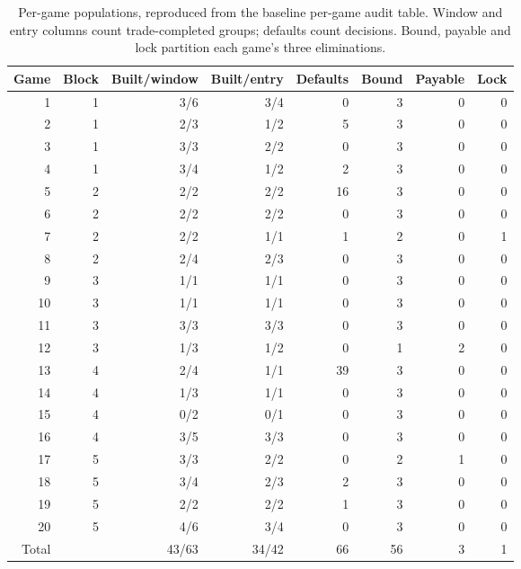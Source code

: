 \begin{table}[htbp]
\centering\small
\begin{tabular}{rrrrrrrr}\toprule
Game & Block & Built/window & Built/entry & Defaults & Bound & Payable & Lock\\\midrule
1 & 1 & 3/6 & 3/4 & 0 & 3 & 0 & 0 \\
2 & 1 & 2/3 & 1/2 & 5 & 3 & 0 & 0 \\
3 & 1 & 3/3 & 2/2 & 0 & 3 & 0 & 0 \\
4 & 1 & 3/4 & 1/2 & 2 & 3 & 0 & 0 \\
5 & 2 & 2/2 & 2/2 & 16 & 3 & 0 & 0 \\
6 & 2 & 2/2 & 2/2 & 0 & 3 & 0 & 0 \\
7 & 2 & 2/2 & 1/1 & 1 & 2 & 0 & 1 \\
8 & 2 & 2/4 & 2/3 & 0 & 3 & 0 & 0 \\
9 & 3 & 1/1 & 1/1 & 0 & 3 & 0 & 0 \\
10 & 3 & 1/1 & 1/1 & 0 & 3 & 0 & 0 \\
11 & 3 & 3/3 & 3/3 & 0 & 3 & 0 & 0 \\
12 & 3 & 1/3 & 1/2 & 0 & 1 & 2 & 0 \\
13 & 4 & 2/4 & 1/1 & 39 & 3 & 0 & 0 \\
14 & 4 & 1/3 & 1/1 & 0 & 3 & 0 & 0 \\
15 & 4 & 0/2 & 0/1 & 0 & 3 & 0 & 0 \\
16 & 4 & 3/5 & 3/3 & 0 & 3 & 0 & 0 \\
17 & 5 & 3/3 & 2/2 & 0 & 2 & 1 & 0 \\
18 & 5 & 3/4 & 2/3 & 2 & 3 & 0 & 0 \\
19 & 5 & 2/2 & 2/2 & 1 & 3 & 0 & 0 \\
20 & 5 & 4/6 & 3/4 & 0 & 3 & 0 & 0 \\
\midrule Total & & 43/63 & 34/42 & 66 & 56 & 3 & 1\\\bottomrule
\end{tabular}
\caption{Per-game populations, reproduced from the baseline per-game audit table. Window and entry columns count trade-completed groups; defaults count decisions. Bound, payable and lock partition each game's three eliminations.}
\label{tab:per-game}
\end{table}
